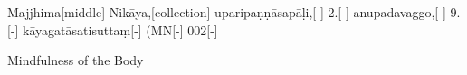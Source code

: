 
\begin{samepage}
\begingl[glneveryline={\PaliGlossA,\PaliGlossB}]
Majjhima[middle] Nikāya,[collection] uparipaṇṇāsapāḷi,[-] 2.[-] anupadavaggo,[-] 9.[-] kāyagatāsatisuttaṃ[-] (MN[-] 002[-]
\endgl
\nopagebreak
\linespread{0.5}
\begin{spacin}{0.2}
{\PaliGlossFT Mindfulness of the Body}
\end{spacin}
\vskip 12pt
\end{samepage}

